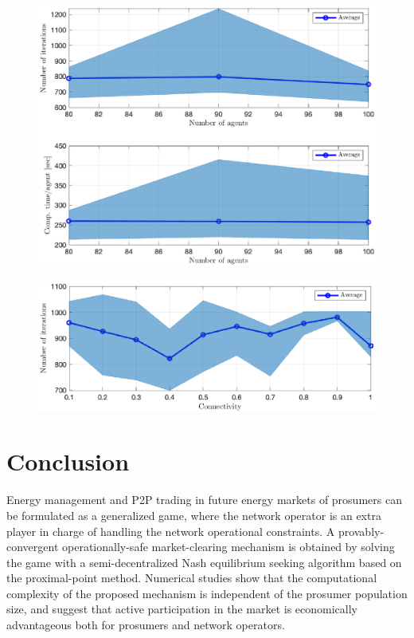 \documentclass{IEEEtran}  %
\newcommand{\0}{\mathbf{0}}
\newcommand{\1}{\mathbf{1}}
\newcommand{\edit}[1]{\color{blue}{#1}\color{black}}
\begin{document}
\begin{figure}[t]
	\centering
	\includegraphics[width=1\linewidth]{figures/simAg_810.eps}
	\caption{\edit{The total number of iterations (top) and the total computational time per agent in seconds (bottom). }
	}
	\label{fig:simE1}
\end{figure}
\begin{figure}[t]
	\centering
	\includegraphics[width=1\linewidth]{figures/simCon.eps}
	\caption{\edit{The total number of iterations  vs the connectivity level (the number of trading links). }
	}
	\label{fig:simE2}
\end{figure}

\section{Conclusion}
Energy management and P2P trading in future energy markets of prosumers can be formulated as a generalized game, where the network operator is an extra player in charge of handling the network operational constraints. A provably-convergent operationally-safe market-clearing mechanism is obtained by solving the game with a semi-decentralized Nash equilibrium seeking algorithm based on the proximal-point method.    
%
Numerical studies show that the computational complexity of the proposed mechanism is independent of the prosumer population size, and suggest that active participation in the market is economically advantageous both for prosumers and network operators.
\end{document}
